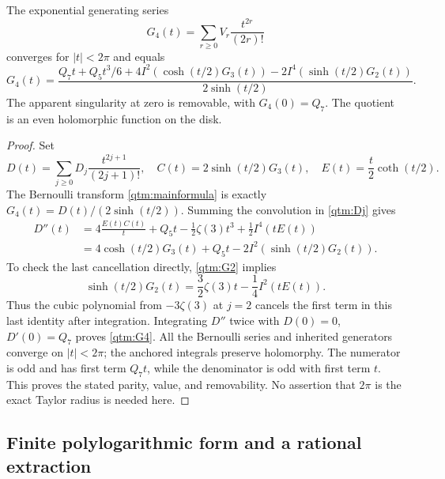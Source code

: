 \begin{theorem}
\label{qtm:generator}
The exponential generating series
\begin{equation}\label{qtm:G4def}
 G_4(t)=\sum_{r\ge0}V_r\frac{t^{2r}}{(2r)!}
\end{equation}
converges for $|t|<2\pi$ and equals
\begin{equation}\label{qtm:G4}
 \boxed{\displaystyle
 G_4(t)=\frac{Q_7t+Q_5t^3/6
       +4I^2\!\left(\cosh(t/2)G_3(t)\right)
       -2I^4\!\left(\sinh(t/2)G_2(t)\right)}
       {2\sinh(t/2)}.}
\end{equation}
The apparent singularity at zero is removable, with $G_4(0)=Q_7$.
The quotient is an even holomorphic function on the disk.
\end{theorem}

\begin{proof}
Set
\[
 D(t)=\sum_{j\ge0}D_j\frac{t^{2j+1}}{(2j+1)!},\quad
 C(t)=2\sinh(t/2)G_3(t),\quad E(t)=\frac t2\coth(t/2).
\]
The Bernoulli transform \eqref{qtm:mainformula} is exactly
$G_4(t)=D(t)/(2\sinh(t/2))$.  Summing the convolution in
\eqref{qtm:Dj} gives
\begin{align*}
 D''(t)
   &=4\frac{E(t)C(t)}t+Q_5t-\frac12\zeta(3)t^3
       +\frac12I^4(tE(t))\\
   &=4\cosh(t/2)G_3(t)+Q_5t
       -2I^2\!\left(\sinh(t/2)G_2(t)\right).
\end{align*}
To check the last cancellation directly, \eqref{qtm:G2} implies
\[
 \sinh(t/2)G_2(t)=\frac32\zeta(3)t-\frac14I^2(tE(t)).
\]
Thus the cubic polynomial from $-3\zeta(3)$ at $j=2$ cancels
the first term in this last identity after integration.  Integrating
$D''$ twice with $D(0)=0$, $D'(0)=Q_7$ proves
\eqref{qtm:G4}.  All the Bernoulli series and inherited generators
converge on $|t|<2\pi$; the anchored integrals preserve holomorphy.
The numerator is odd and has first term $Q_7t$, while the denominator
is odd with first term $t$.  This proves the stated parity, value, and
removability.  No assertion that $2\pi$ is the exact Taylor radius is
needed here.
\end{proof}

\subsection{Finite polylogarithmic form and a rational extraction}

